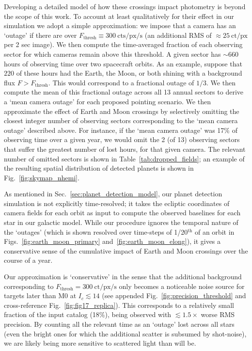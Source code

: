 Developing a detailed model of how these crossings impact \tesss photometry is beyond the scope of this work.
To account at least qualitatively for their effect in our simulation we adopt a simple approximation: we impose that a camera has an `outage' if there are over $F_\text{thresh}\equiv300\ \text{cts/px/s}$ (an additional RMS of $\approx 25\ \mathrm{ct/px}$ per 2 sec image).
We then compute the time-averaged fraction of each observing sector for which \tesss cameras remain above this threshold. 
A given sector has $\sim660$ hours of observing time over two spacecraft orbits.
As an example, suppose that $220$ of these hours had the Earth, the Moon, or both shining with a background flux $F > F_\text{thresh}$. 
This would correspond to a fractional outage of $1/3$. 
We then compute the mean of this fractional outage across all 13 annual sectors to derive a `mean camera outage' for each proposed pointing scenario.
We then approximate the effect of Earth and Moon crossings by selectively omitting the closest integer number of observing sectors corresponding to the `mean camera outage' described above.
For instance, if the `mean camera outage' was 17\% of \tesss observing time over a given year, we would omit the 2 (of 13) observing sectors that suffer the greatest number of lost hours, for that given camera.
The relevant number of omitted sectors is shown in Table~\ref{tab:dropped_fields}; an example of the resulting spatial distribution of detected planets is shown in Fig.~\ref{fig:skymap_nhemi}.


As mentioned in Sec.~\ref{sec:planet_detection_model}, our planet detection 
simulation is not explicitly time-resolved; it takes the ecliptic coordinates 
of camera fields for each orbit as input to compute the observed baselines for 
each star in our galactic model.
While our procedure ignores the temporal nature of the `outages' (which is 
shown resolved over time-steps of 1/20$^\mathrm{th}$ of an orbit in 
Figs.~\ref{fig:earth_moon_primary} and~\ref{fig:earth_moon_elong}), it gives a 
conservative sense of the cumulative impact of Earth and Moon crossings over 
the course of a year.

Our approximation is `conservative' in the sense that the additional background 
corresponding to $F_\mathrm{thresh}=300\ \mathrm{ct/px/s}$ only becomes a 
noticeable noise source for targets later than M0 at $I_c \lesssim 14$ (see 
appended Fig.~\ref{fig:precision_threshold} and cross-reference 
Fig.~\ref{fig:fig17_replica}).
This corresponds to a relatively small fraction of the input catalog (18\%), being observed with $\lesssim\! 1.5\times$ worse RMS precision.
By counting all the relevant time as an `outage' lost across all stars (even 
the bright ones for which the additional scatter is subsumed by shot-noise), we 
are likely being more sensitive to scattered light than \tess will be.

